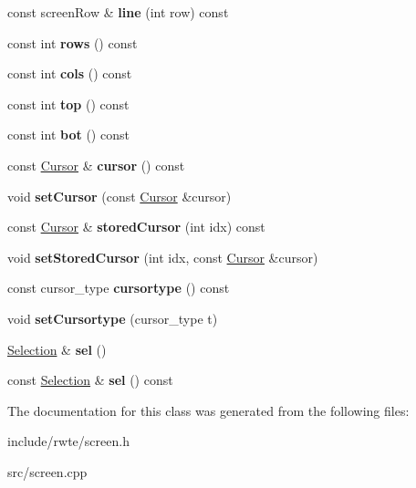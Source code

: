 \begin{DoxyCompactItemize}
const screen\+Row \& {\bfseries line} (int row) const
\item 
\mbox{\label{classScreen_a19ef01956b52b229c0977db5e05d7088}} 
const int {\bfseries rows} () const
\item 
\mbox{\label{classScreen_a3876841ea92eca49f8a369a111ebffec}} 
const int {\bfseries cols} () const
\item 
\mbox{\label{classScreen_aff66933b476dc35fdabd0c58dfc9ecfa}} 
const int {\bfseries top} () const
\item 
\mbox{\label{classScreen_a836004ec41eaf4b418ac56f20f51865c}} 
const int {\bfseries bot} () const
\item 
\mbox{\label{classScreen_a929522d11cf59eda8b2432dae389c5fc}} 
const \mbox{\hyperlink{structCursor}{Cursor}} \& {\bfseries cursor} () const
\item 
\mbox{\label{classScreen_af298ce7441bfe648e87ef1aebfeb498b}} 
void {\bfseries set\+Cursor} (const \mbox{\hyperlink{structCursor}{Cursor}} \&cursor)
\item 
\mbox{\label{classScreen_a9559bf690746afc14859236fee4e5a9d}} 
const \mbox{\hyperlink{structCursor}{Cursor}} \& {\bfseries stored\+Cursor} (int idx) const
\item 
\mbox{\label{classScreen_ab2c169f957fb110f50b68f3a9c6ef4a9}} 
void {\bfseries set\+Stored\+Cursor} (int idx, const \mbox{\hyperlink{structCursor}{Cursor}} \&cursor)
\item 
\mbox{\label{classScreen_ae6b0b385833712eecebdba5fa0f85a0b}} 
const cursor\+\_\+type {\bfseries cursortype} () const
\item 
\mbox{\label{classScreen_a2569de86066729edab99a72a2c3ca9da}} 
void {\bfseries set\+Cursortype} (cursor\+\_\+type t)
\item 
\mbox{\label{classScreen_a94bb212230aa088b7b9ebf2e609fbee2}} 
\mbox{\hyperlink{classSelection}{Selection}} \& {\bfseries sel} ()
\item 
\mbox{\label{classScreen_aec1afd06343f5957a2b3af84846f9fd2}} 
const \mbox{\hyperlink{classSelection}{Selection}} \& {\bfseries sel} () const
\end{DoxyCompactItemize}


The documentation for this class was generated from the following files\+:\begin{DoxyCompactItemize}
\item 
include/rwte/screen.\+h\item 
src/screen.\+cpp\end{DoxyCompactItemize}
